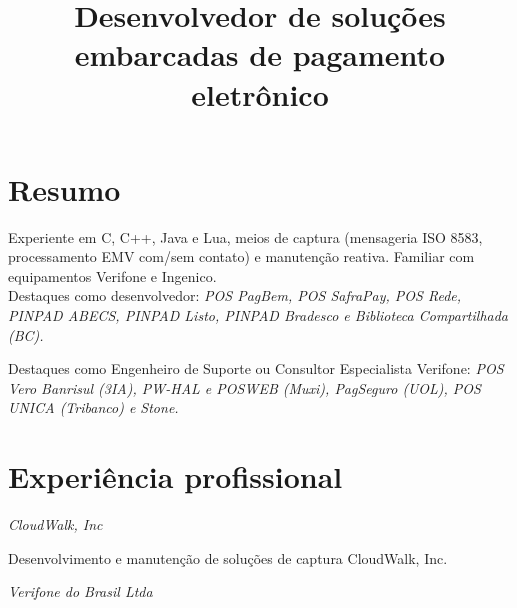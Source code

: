 \documentclass[11pt,a4paper,sans]{moderncv}
\title{\Large Desenvolvedor de soluções\protect\\embarcadas de pagamento eletrônico}
\begin{document}
\maketitle

\section{Resumo}

\vspace{0.5mm}

\hspace{1.25cm} Experiente em C, C++, Java e Lua, meios de captura (mensageria
ISO 8583, processamento EMV com/sem contato) e manutenção reativa. Familiar com
equipamentos Verifone e Ingenico.\protect\\

\hspace{1.25cm} Destaques como desenvolvedor: \textit{POS PagBem, POS SafraPay,
POS Rede, PINPAD ABECS, PINPAD Listo, PINPAD Bradesco e Biblioteca
Compartilhada (BC).}

\hspace{1.25cm} Destaques como Engenheiro de Suporte ou Consultor Especialista
Verifone: \textit{POS Vero Banrisul (3IA), PW-HAL e POSWEB (Muxi), PagSeguro
(UOL), POS UNICA (Tribanco) e Stone.}

\section{Experiência profissional}

\vspace{0.5mm}

\hspace{1.25cm} \textit{CloudWalk, Inc}


\hspace{1.25cm} \begin{minipage}[htb]{\linewidth - 1.25cm}
    Desenvolvimento e manutenção de soluções de captura CloudWalk, Inc.
\end{minipage}

\vspace{\baselineskip}

\hspace{1.25cm} \textit{Verifone do Brasil Ltda}

\end{document}
